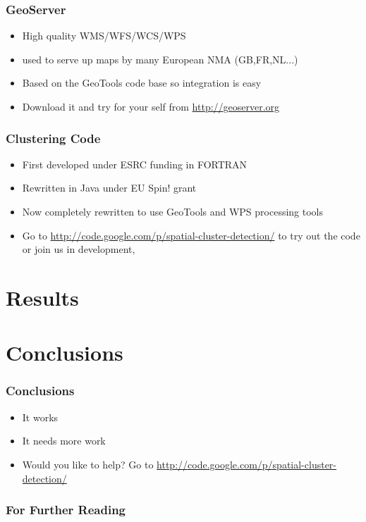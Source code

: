 \documentclass{beamer}
\begin{document}
\begin{frame}[t]
\frametitle{GeoServer}
\begin{itemize}
\item High quality WMS/WFS/WCS/WPS
\item used to serve up maps by many European NMA (GB,FR,NL...)
\item Based on the GeoTools code base so integration is easy
\item Download it and try for your self from \url{http://geoserver.org}
\end{itemize}
\end{frame}

\begin{frame}[t]
\frametitle{Clustering Code}
\begin{itemize}
\item First developed under ESRC funding in FORTRAN
\item Rewritten in Java under EU Spin! grant
\item Now completely rewritten to use GeoTools and WPS processing tools
\item Go to \url{http://code.google.com/p/spatial-cluster-detection/} to try out the code or join us in development, 
\end{itemize}
\end{frame}

\section{Results}
\begin{frame}[t]
\frametitle{}
\end{frame}

\section{Conclusions}
\begin{frame}[t]
\frametitle{Conclusions}
\begin{itemize}
\item It works
\item It needs more work 
\item Would you like to help? Go to \href{http://code.google.com/p/spatial-cluster-detection/}{http://code.google.com/p/spatial-cluster-detection/}
\end{itemize}
\end{frame}


\begin{frame}[allowframebreaks]
  \frametitle<presentation>{For Further Reading}
    

\end{frame}
\end{document}
